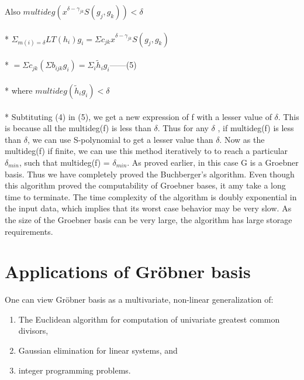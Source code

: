 \documentclass[12pt]{article}
\begin{document}
Also $ multideg(x^{\delta- \gamma_{jk}}S(g_{j},g_{k}))<\delta$\\\\*
$\Sigma_{m(i)=\delta} LT(h_{i})g_{i} = \Sigma c_{jk} x^{\delta - \gamma_{jk}} S(g_{j},g_{k})$\\\\*
$= \Sigma c_{jk} ( \Sigma b_{ijk}g_{i} )= \Sigma_{i} \tilde{h}_{i}g_{i}$------(5)\\\\*
where $multideg(\tilde{h}_{i}g_{i}) < \delta $\\\\*
Subtituting (4) in (5), we get a new expression of f with a lesser value of $\delta$.
This is because all the multideg(f) is less than $\delta$. Thus for any $\delta$ , if multideg(f) is less than $\delta$, we can use S-polynomial to get a lesser value than $\delta$. Now as the multideg(f) if finite, we can use this method iteratively to to reach a particular $\delta_{min}$, such that multideg(f) = $\delta_{min}$. As proved earlier, in this case G is a Groebner basis.
Thus we have completely proved the Buchberger's algorithm. Even though this algorithm proved the computability of Groebner bases, it amy take a long time to terminate. The time complexity of the algorithm is doubly exponential in the input data, which implies that its worst case behavior may be very slow. As the size of the Groebner basis can be very large, the algorithm has large storage requirements.

\newpage
\section{Applications of Gr\"{o}bner basis}
One can view Gr\"{o}bner basis as a multivariate, non-linear generalization of:
\begin{enumerate}
\item The Euclidean algorithm for computation of univariate greatest common divisors,
\item Gaussian elimination for linear systems, and
\item integer programming problems.
\end{enumerate}
\end{document}
